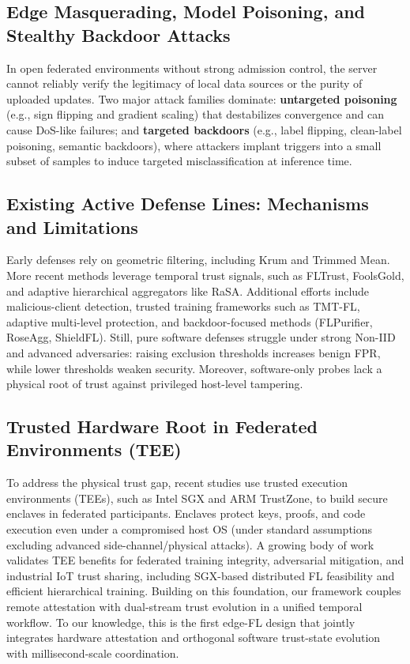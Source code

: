 \documentclass[runningheads]{llncs}
\begin{document}
\subsection{Edge Masquerading, Model Poisoning, and Stealthy Backdoor Attacks}
In open federated environments without strong admission control, the server cannot reliably verify the legitimacy of local data sources or the purity of uploaded updates. Two major attack families dominate: \textbf{untargeted poisoning} (e.g., sign flipping and gradient scaling) that destabilizes convergence and can cause DoS-like failures; and \textbf{targeted backdoors} (e.g., label flipping, clean-label poisoning, semantic backdoors), where attackers implant triggers into a small subset of samples to induce targeted misclassification at inference time.

\subsection{Existing Active Defense Lines: Mechanisms and Limitations}
Early defenses rely on geometric filtering, including Krum\cite{blanchard2017krum} and Trimmed Mean\cite{yin2018byzantine}. More recent methods leverage temporal trust signals, such as FLTrust\cite{cao2021fltrust}, FoolsGold\cite{fung2020foolsgold}, and adaptive hierarchical aggregators like RaSA\cite{wang2025rasa}. Additional efforts include malicious-client detection\cite{dou2025toward}, trusted training frameworks such as TMT-FL\cite{lu2025tmt}, adaptive multi-level protection\cite{wang2024federated}, and backdoor-focused methods (FLPurifier, RoseAgg, ShieldFL)\cite{flpurifier,roseagg,shieldfl}. Still, pure software defenses struggle under strong Non-IID and advanced adversaries: raising exclusion thresholds increases benign FPR, while lower thresholds weaken security. Moreover, software-only probes lack a physical root of trust against privileged host-level tampering.

\subsection{Trusted Hardware Root in Federated Environments (TEE)}
To address the physical trust gap, recent studies use trusted execution environments (TEEs), such as Intel SGX and ARM TrustZone, to build secure enclaves in federated participants. Enclaves protect keys, proofs, and code execution even under a compromised host OS (under standard assumptions excluding advanced side-channel/physical attacks)\cite{liao2024verifiable,zhang2025rppfl}. A growing body of work validates TEE benefits for federated training integrity, adversarial mitigation, and industrial IoT trust sharing\cite{r1_tee_integrity,r5_tee_mitigating,r12_iot_tee}, including SGX-based distributed FL feasibility\cite{xu2021distributed} and efficient hierarchical training\cite{yan2024efficient}. Building on this foundation, our framework couples remote attestation with dual-stream trust evolution in a unified temporal workflow. To our knowledge, this is the first edge-FL design that jointly integrates hardware attestation and orthogonal software trust-state evolution with millisecond-scale coordination.
\end{document}
